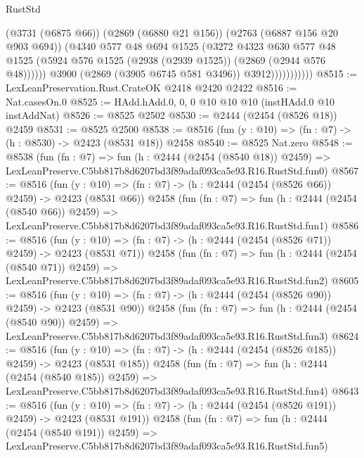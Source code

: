 \begin{lexlean}{RustStd}
\begin{coremodule}
                            (@3731 (@6875 @66))
                            (@2869 (@6880 @21 @156))
                            (@2763 (@6887 @156 @20 @903 @694))
                            (@4340
                              @577
                              @48
                              @694
                              @1525
                              (@3272
                                @4323
                                @630
                                @577
                                @48
                                @1525
                                (@5924 @576 @1525 (@2938 (@2939 @1525)) (@2869 (@2944 @576 @48))))))
                          @3900
                          (@2869 (@3905 @6745 @581 @3496))
                          @3912)))))))))))
@8515 := LexLeanPreservation.Rust.CrateOK @2418 @2420 @2422
@8516 := Nat.casesOn.{0}
@8525 := HAdd.hAdd.{0, 0, 0} @10 @10 @10 (instHAdd.{0} @10 instAddNat)
@8526 := @8525 @2502
@8530 := @2444 (@2454 (@8526 @18)) @2459
@8531 := @8525 @2500
@8538 := @8516 (fun (y : @10) => (fn : @7) -> (h : @8530) -> @2423 (@8531 @18)) @2458
@8540 := @8525 Nat.zero
@8548 := @8538
    (fun (fn : @7) =>
    fun (h : @2444 (@2454 (@8540 @18)) @2459) =>
    LexLeanPreserve.C5bb817b8d6207bd3f89adaf093ca5e93.R16.RustStd.fun0)
@8567 := @8516
    (fun (y : @10) => (fn : @7) -> (h : @2444 (@2454 (@8526 @66)) @2459) -> @2423 (@8531 @66))
    @2458
    (fun (fn : @7) =>
    fun (h : @2444 (@2454 (@8540 @66)) @2459) =>
    LexLeanPreserve.C5bb817b8d6207bd3f89adaf093ca5e93.R16.RustStd.fun1)
@8586 := @8516
    (fun (y : @10) => (fn : @7) -> (h : @2444 (@2454 (@8526 @71)) @2459) -> @2423 (@8531 @71))
    @2458
    (fun (fn : @7) =>
    fun (h : @2444 (@2454 (@8540 @71)) @2459) =>
    LexLeanPreserve.C5bb817b8d6207bd3f89adaf093ca5e93.R16.RustStd.fun2)
@8605 := @8516
    (fun (y : @10) => (fn : @7) -> (h : @2444 (@2454 (@8526 @90)) @2459) -> @2423 (@8531 @90))
    @2458
    (fun (fn : @7) =>
    fun (h : @2444 (@2454 (@8540 @90)) @2459) =>
    LexLeanPreserve.C5bb817b8d6207bd3f89adaf093ca5e93.R16.RustStd.fun3)
@8624 := @8516
    (fun (y : @10) => (fn : @7) -> (h : @2444 (@2454 (@8526 @185)) @2459) -> @2423 (@8531 @185))
    @2458
    (fun (fn : @7) =>
    fun (h : @2444 (@2454 (@8540 @185)) @2459) =>
    LexLeanPreserve.C5bb817b8d6207bd3f89adaf093ca5e93.R16.RustStd.fun4)
@8643 := @8516
    (fun (y : @10) => (fn : @7) -> (h : @2444 (@2454 (@8526 @191)) @2459) -> @2423 (@8531 @191))
    @2458
    (fun (fn : @7) =>
    fun (h : @2444 (@2454 (@8540 @191)) @2459) =>
    LexLeanPreserve.C5bb817b8d6207bd3f89adaf093ca5e93.R16.RustStd.fun5)

\end{coremodule}
\end{lexlean}
